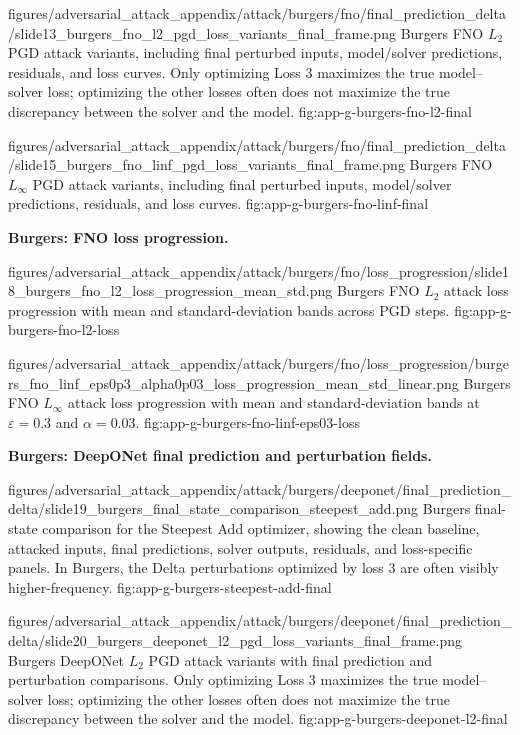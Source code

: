\clearpage

\appendixattackfigcompact
  {figures/adversarial_attack_appendix/attack/burgers/fno/final_prediction_delta/slide13_burgers_fno_l2_pgd_loss_variants_final_frame.png}
  {Burgers FNO $L_2$ PGD attack variants, including final perturbed inputs,
  model/solver predictions, residuals, and loss curves. Only optimizing Loss 3
  maximizes the true model--solver loss; optimizing the other losses often does
  not maximize the true discrepancy between the solver and the model.}
  {fig:app-g-burgers-fno-l2-final}

\appendixattackfigcompact
  {figures/adversarial_attack_appendix/attack/burgers/fno/final_prediction_delta/slide15_burgers_fno_linf_pgd_loss_variants_final_frame.png}
  {Burgers FNO $L_\infty$ PGD attack variants, including final perturbed
  inputs, model/solver predictions, residuals, and loss curves.}
  {fig:app-g-burgers-fno-linf-final}

\clearpage

\noindent\textbf{Burgers: FNO loss progression.}

\appendixattackfig
  {figures/adversarial_attack_appendix/attack/burgers/fno/loss_progression/slide18_burgers_fno_l2_loss_progression_mean_std.png}
  {Burgers FNO $L_2$ attack loss progression with mean and standard-deviation
  bands across PGD steps.}
  {fig:app-g-burgers-fno-l2-loss}

\appendixattackfig
  {figures/adversarial_attack_appendix/attack/burgers/fno/loss_progression/burgers_fno_linf_eps0p3_alpha0p03_loss_progression_mean_std_linear.png}
  {Burgers FNO $L_\infty$ attack loss progression with mean and
  standard-deviation bands at $\varepsilon=0.3$ and $\alpha=0.03$.}
  {fig:app-g-burgers-fno-linf-eps03-loss}

\FloatBarrier
\noindent\textbf{Burgers: DeepONet final prediction and perturbation fields.}


\appendixattackfig
  {figures/adversarial_attack_appendix/attack/burgers/deeponet/final_prediction_delta/slide19_burgers_final_state_comparison_steepest_add.png}
  {Burgers final-state comparison for the Steepest Add optimizer, showing the
  clean baseline, attacked inputs, final predictions, solver outputs, residuals,
  and loss-specific panels. In Burgers, the Delta perturbations optimized by
  loss 3 are often visibly higher-frequency.}
  {fig:app-g-burgers-steepest-add-final}

\appendixattackfigcompact
  {figures/adversarial_attack_appendix/attack/burgers/deeponet/final_prediction_delta/slide20_burgers_deeponet_l2_pgd_loss_variants_final_frame.png}
  {Burgers DeepONet $L_2$ PGD attack variants with final prediction and
  perturbation comparisons. Only optimizing Loss 3 maximizes the true
  model--solver loss; optimizing the other losses often does not maximize the
  true discrepancy between the solver and the model.}
  {fig:app-g-burgers-deeponet-l2-final}

